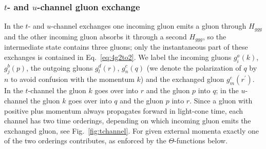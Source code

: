 \documentclass[a4paper,11pt]{article}
\begin{document}
{\color{chg}\allowdisplaybreaks
\subsubsection*{$t$- and $u$-channel gluon exchange}
In the $t$- and $u$-channel exchanges one incoming gluon emits a gluon through $H_{ggg}$ and the other incoming gluon absorbs it through a second $H_{ggg}$, so the intermediate state contains three gluons; only the instantaneous part of these exchanges is contained in Eq.~\eqref{eq:4g2to2}. We label the incoming gluons $g^{a}_{i}(k)$, $g^{b}_{j}(p)$, the outgoing gluons $g^{d}_{l}(r)$, $g^{c}_{n}(q)$ (we denote the polarization of $q$ by $n$ to avoid confusion with the momentum $k$) and the exchanged gluon $g^{e}_{m}(r^{\prime})$. In the $t$-channel the gluon $k$ goes over into $r$ and the gluon $p$ into $q$; in the $u$-channel the gluon $k$ goes over into $q$ and the gluon $p$ into $r$. Since a gluon with positive plus momentum always propagates forward in light-cone time, each channel has two time orderings, depending on which incoming gluon emits the exchanged gluon, see Fig.~\ref{fig:tchannel}. For given external momenta exactly one of the two orderings contributes, as enforced by the $\Theta$-functions below.

}
\end{document}
